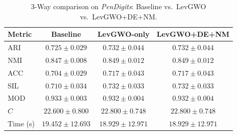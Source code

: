 \begin{table}[htbp]
\centering
\caption{3-Way comparison on \textit{PenDigits}: Baseline vs.\ LevGWO vs.\ LevGWO+DE+NM.}
\label{tab:pendigits_3way}
\begin{tabular}{lccc}
\toprule
Metric & Baseline & LevGWO-only & LevGWO+DE+NM \\
\midrule
ARI & $0.725 \pm 0.029$ & $\mathbf{0.732 \pm 0.044}$ & $\mathbf{0.732 \pm 0.044}$ \\
NMI & $0.847 \pm 0.008$ & $\mathbf{0.849 \pm 0.012}$ & $\mathbf{0.849 \pm 0.012}$ \\
ACC & $0.704 \pm 0.029$ & $\mathbf{0.717 \pm 0.043}$ & $\mathbf{0.717 \pm 0.043}$ \\
SIL & $0.710 \pm 0.034$ & $\mathbf{0.732 \pm 0.033}$ & $\mathbf{0.732 \pm 0.033}$ \\
MOD & $\mathbf{0.933 \pm 0.003}$ & $0.932 \pm 0.004$ & $0.932 \pm 0.004$ \\
$C$ & $22.600 \pm 0.800$ & $22.800 \pm 0.748$ & $22.800 \pm 0.748$ \\
Time (s) & $19.452 \pm 12.693$ & $18.929 \pm 12.971$ & $18.929 \pm 12.971$ \\
\bottomrule
\end{tabular}
\end{table}